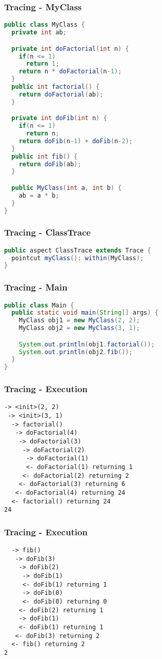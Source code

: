 \documentclass[11pt]{beamer}
\begin{document}
\begin{frame}[fragile]
   \frametitle{Tracing - MyClass}
   {\tiny
   \begin{lstlisting}[language=java]
public class MyClass {
  private int ab;

  private int doFactorial(int n) {
    if(n <= 1)
      return 1;
    return n * doFactorial(n-1);
  }
  public int factorial() {
    return doFactorial(ab);
  }

  private int doFib(int n) {
    if(n <= 1)
      return n;
    return doFib(n-1) + doFib(n-2);
  }
  public int fib() {
    return doFib(ab);
  }

  public MyClass(int a, int b) {
    ab = a * b;
  }
}
   \end{lstlisting}}
\end{frame}

\begin{frame}[fragile]
   \frametitle{Tracing - ClassTrace}
   {\small
   \begin{lstlisting}[language=java]
public aspect ClassTrace extends Trace {
  pointcut myClass(): within(MyClass);
}
   \end{lstlisting}}
\end{frame}

\begin{frame}[fragile]
   \frametitle{Tracing - Main}
   {\footnotesize
   \begin{lstlisting}[language=java]
public class Main {
  public static void main(String[] args) {
    MyClass obj1 = new MyClass(2, 2);
    MyClass obj2 = new MyClass(3, 1);

    System.out.println(obj1.factorial());
    System.out.println(obj2.fib());
  }
}
   \end{lstlisting}}
\end{frame}

\begin{frame}[fragile]
   \frametitle{Tracing - Execution}
   {\scriptsize
   \begin{lstlisting}
-> <init>(2, 2)
 -> <init>(3, 1)
  -> factorial()
   -> doFactorial(4)
    -> doFactorial(3)
     -> doFactorial(2)
      -> doFactorial(1)
      <- doFactorial(1) returning 1
     <- doFactorial(2) returning 2
    <- doFactorial(3) returning 6
   <- doFactorial(4) returning 24
  <- factorial() returning 24
24
   \end{lstlisting}}
\end{frame}

\begin{frame}[fragile]
   \frametitle{Tracing - Execution}
   {\scriptsize
   \begin{lstlisting}
  -> fib()
   -> doFib(3)
    -> doFib(2)
     -> doFib(1)
     <- doFib(1) returning 1
     -> doFib(0)
     <- doFib(0) returning 0
    <- doFib(2) returning 1
    -> doFib(1)
    <- doFib(1) returning 1
   <- doFib(3) returning 2
  <- fib() returning 2
2
   \end{lstlisting}}
\end{frame}
\end{document}
